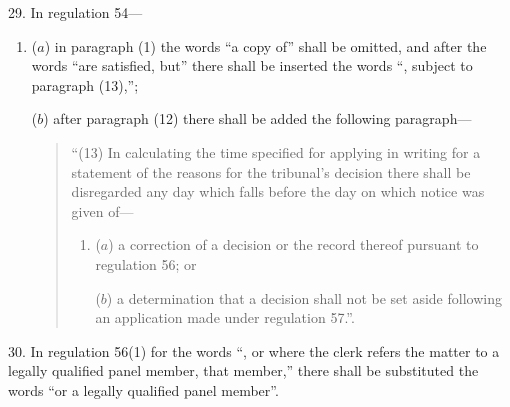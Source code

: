 \documentclass[12pt,a4paper]{article}
\begin{document}
29.  In regulation 54—
\begin{enumerate}\item[]
($a$) in paragraph (1) the words “a copy of” shall be omitted, and after the words “are satisfied, but” there shall be inserted the words “, subject to paragraph (13),”;

($b$) after paragraph (12) there shall be added the following paragraph—
\begin{quotation}
“(13) In calculating the time specified for applying in writing for a statement of the reasons for the tribunal’s decision there shall be disregarded any day which falls before the day on which notice was given of—
\begin{enumerate}\item[]
($a$) a correction of a decision or the record thereof pursuant to regulation 56; or

($b$) a determination that a decision shall not be set aside following an application made under regulation 57.”.
\end{enumerate}
\end{quotation}
\end{enumerate}

\medskip

30.  In regulation 56(1) for the words “, or where the clerk refers the matter to a legally qualified panel member, that member,” there shall be substituted the words “or a legally qualified panel member”.

\medskip
\end{document}
